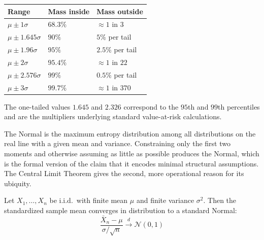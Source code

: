 \vspace{1em}

\begin{keybox}
\begin{center}
\begin{tabular}{lll}
\toprule
\textbf{Range} & \textbf{Mass inside} & \textbf{Mass outside} \\
\midrule
$\mu \pm 1\sigma$      & $68.3\%$ & $\approx 1$ in $3$ \\
$\mu \pm 1.645\sigma$  & $90\%$   & $5\%$ per tail \\
$\mu \pm 1.96\sigma$   & $95\%$   & $2.5\%$ per tail \\
$\mu \pm 2\sigma$      & $95.4\%$ & $\approx 1$ in $22$ \\
$\mu \pm 2.576\sigma$  & $99\%$   & $0.5\%$ per tail \\
$\mu \pm 3\sigma$      & $99.7\%$ & $\approx 1$ in $370$ \\
\bottomrule
\end{tabular}
\end{center}

\vspace{2ex}

The one-tailed values $1.645$ and $2.326$ correspond to the $95$th and $99$th percentiles and are the multipliers underlying standard value-at-risk calculations.
\end{keybox}

\vspace{1ex}

\begin{remark}
The Normal is the maximum entropy distribution among all distributions on the real line with a given mean and variance. Constraining only the first two moments and otherwise assuming as little as possible produces the Normal, which is the formal version of the claim that it encodes minimal structural assumptions. The Central Limit Theorem gives the second, more operational reason for its ubiquity.
\end{remark}

\begin{theorem}
Let $X_1, \dots, X_n$ be i.i.d.\ with finite mean $\mu$ and finite variance $\sigma^2$. Then the standardized sample mean converges in distribution to a standard Normal:
\[
\frac{\bar{X}_n - \mu}{\sigma/\sqrt{n}} \xrightarrow{\;d\;} \mathcal{N}(0,1)
\]
\end{theorem}

